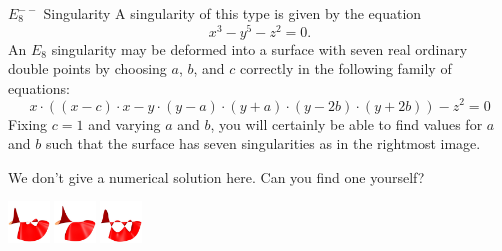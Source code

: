 \begin{surferPage}[E8-- Singularity]{$E_8^{--}$ Singularity}
	A singularity of this type is given by the equation
	\[
		x^3-y^5-z^2=0.
	\]
	An $E_8$ singularity may be deformed into a surface with seven real ordinary double points by choosing $a$, $b$, and $c$ correctly in the following family of equations:
	\[
		x\cdot((x-c)\cdot x-y\cdot (y-a)\cdot (y+a)\cdot(y-2b)\cdot(y+2b))-z^2=0
	\]
	Fixing $c=1$ and varying $a$ and $b$, you will certainly be able to find values for $a$ and $b$ such that the surface has seven singularities as in the rightmost image.

	We don't give a numerical solution here. Can you find one yourself?
	\begin{Centering*}%
		\includegraphics[width=1.1cm]{../../common/images/E8mm_1}\quad%
		\includegraphics[width=1.1cm]{../../common/images/E8mm_0}\quad%
		\includegraphics[width=1.1cm]{../../common/images/E8mm_2}%
	\end{Centering*}
\end{surferPage}

